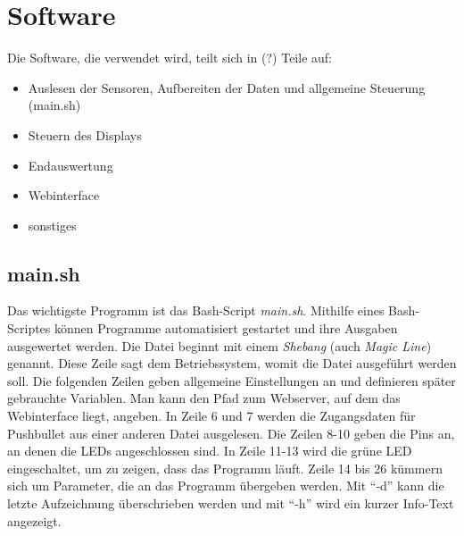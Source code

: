 \chapter{Software}
Die Software, die verwendet wird, teilt sich in (?) Teile auf:
\begin{itemize}
\item Auslesen der Sensoren, Aufbereiten der Daten und allgemeine Steuerung (main.sh)
\item Steuern des Displays
\item Endauswertung
\item Webinterface
\item sonstiges
\end{itemize}

\section{main.sh}
\label{sec:main.sh}

Das wichtigste Programm ist das Bash-Script \textit{main.sh}. Mithilfe eines Bash-Scriptes können Programme automatisiert gestartet und ihre Ausgaben ausgewertet werden.
Die Datei beginnt mit einem \textit{Shebang} (auch \textit{Magic Line}) genannt. Diese Zeile sagt dem Betriebssystem, womit die Datei ausgeführt werden soll.
Die folgenden Zeilen geben allgemeine Einstellungen an und definieren später gebrauchte Variablen. Man kann den Pfad zum Webserver, auf dem das Webinterface liegt, angeben. In Zeile 6 und 7 werden die Zugangsdaten für Pushbullet aus einer anderen Datei ausgelesen. Die Zeilen 8-10 geben die Pins an, an denen die LEDs angeschlossen sind. In Zeile 11-13 wird die grüne LED eingeschaltet, um zu zeigen, dass das Programm läuft.
Zeile 14 bis 26 kümmern sich um Parameter, die an das Programm übergeben werden. Mit \enquote{-d} kann die letzte Aufzeichnung überschrieben werden und mit \enquote{-h} wird ein kurzer Info-Text angezeigt.
 
